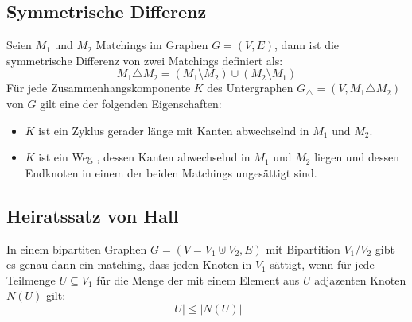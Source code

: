 \documentclass[10pt,a4paper,landscape]{article}
\begin{document}
\begin{multicols*}{2}
    \subsection*{ Symmetrische Differenz }
    Seien $M_1$ und $M_2$ Matchings im Graphen $G = (V,E)$, dann ist die symmetrische Differenz von zwei Matchings definiert als:
    \[ M_1 \triangle M_2 = (M_1 \setminus M_2) \cup (M_2 \setminus M_1) \]
    Für jede Zusammenhangskomponente $K$ des Untergraphen $G_{\triangle} = (V,M_1 \triangle M_2)$ von $G$ gilt eine der folgenden 
    Eigenschaften:
    \begin{itemize}
        \item $K$ ist ein Zyklus gerader länge mit Kanten abwechselnd in $M_1$ und $M_2$.
        \item $K$ ist ein Weg , dessen Kanten abwechselnd in $M_1$ und $M_2$ liegen und dessen Endknoten in einem der beiden Matchings ungesättigt sind.
    \end{itemize}
    \subsection*{ Heiratssatz von Hall }
    In einem bipartiten Graphen $G = (V = V_1 \uplus V_2, E)$ mit Bipartition $V_1$/$V_2$ gibt es genau dann ein matching, dass jeden Knoten in $V_1$ sättigt, 
    wenn für jede Teilmenge $U \subseteq V_1$ für die Menge der mit einem Element aus $U$ adjazenten Knoten $N(U)$ gilt:
    \[ |U| \leq |N(U)| \]


\end{multicols*}
\end{document}

